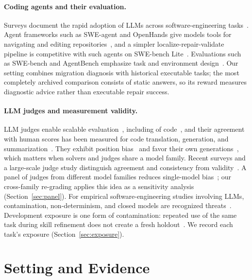 \documentclass[11pt]{article}
\begin{document}
\paragraph{Coding agents and their evaluation.}
Surveys document the rapid adoption of LLMs across software-engineering tasks~\citep{fan2023llm4se,hou2024llm4se}. Agent frameworks such as SWE-agent and OpenHands give models tools for navigating and editing repositories~\citep{yang2024sweagent,wang2025openhands}, and a simpler localize-repair-validate pipeline is competitive with such agents on SWE-bench Lite~\citep{xia2025agentless}. Evaluations such as SWE-bench and AgentBench emphasize task and environment design~\citep{swe-bench,agentbench}. Our setting combines migration diagnosis with historical executable tasks; the most completely archived comparison consists of static answers, so its reward measures diagnostic advice rather than executable repair success.

\paragraph{LLM judges and measurement validity.}
LLM judges enable scalable evaluation~\citep{mt-bench-judge,chiang2023llmeval,liu2023geval}, including of code~\citep{zhuo2024icescore}, and their agreement with human scores has been measured for code translation, generation, and summarization~\citep{wang2025llmjudgese}. They exhibit position bias~\citep{wang2024notfair} and favor their own generations~\citep{self-preference}, which matters when solvers and judges share a model family. Recent surveys and a large-scale judge study distinguish agreement and consistency from validity~\citep{gu2024judgesurvey,he2025courtroom,judge-validity}. A panel of judges from different model families reduces single-model bias~\citep{verga2024juries}; our cross-family re-grading applies this idea as a sensitivity analysis (Section~\ref{sec:panel}). For empirical software-engineering studies involving LLMs, contamination, non-determinism, and closed models are recognized threats~\citep{sallou2024breaking,wagner2025towards}. Development exposure is one form of contamination: repeated use of the same task during skill refinement does not create a fresh holdout~\citep{time-travel-contamination}. We record each task's exposure (Section~\ref{sec:exposure}).

\section{Setting and Evidence}\label{sec:setting}
\end{document}
